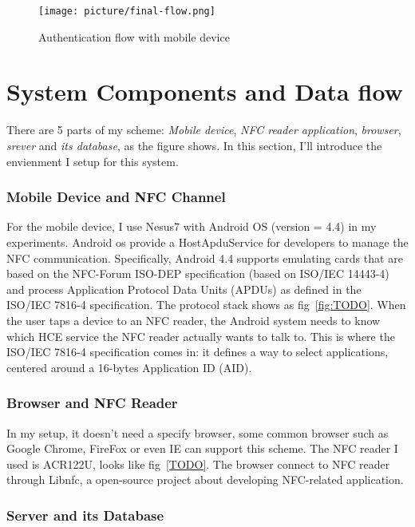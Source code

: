 \begin{CJK}{Bg5}{bsmi}
\begin{figure}
\centering
\label{fig:final-flow}
\texttt{[image: picture/final-flow.png]}
\caption{Authentication flow with mobile device}
\end{figure}

\section{System Components and Data flow}

There are 5 parts of my scheme: \emph{Mobile device}, \emph{NFC reader application}, \emph{browser}, \emph{srever} and \emph{its database}, as the figure shows. In this section, I'll introduce the envienment I setup for this system.

\subsubsection{Mobile Device and NFC Channel}

For the mobile device, I use Nesus7 with Android OS (version = 4.4) in my experiments. Android os provide a HostApduService for developers to manage the NFC communication. Specifically, Android 4.4 supports emulating cards that are based on the NFC-Forum ISO-DEP specification (based on ISO/IEC 14443-4) and process Application Protocol Data Units (APDUs) as defined in the ISO/IEC 7816-4 specification. The protocol stack shows as fig~\ref{fig:TODO}. When the user taps a device to an NFC reader, the Android system needs to know which HCE service the NFC reader actually wants to talk to. This is where the ISO/IEC 7816-4 specification comes in: it defines a way to select applications, centered around a 16-bytes Application ID (AID).

\subsubsection{Browser and NFC Reader}
In my setup, it doesn't need a specify browser, some common browser such as Google Chrome, FireFox or even IE can support this scheme. The NFC reader I used is ACR122U, looks like fig~\ref{TODO}. The browser connect to NFC reader through Libnfc, a open-source project about developing NFC-related application.

\subsubsection{Server and its Database}


\end{CJK}
